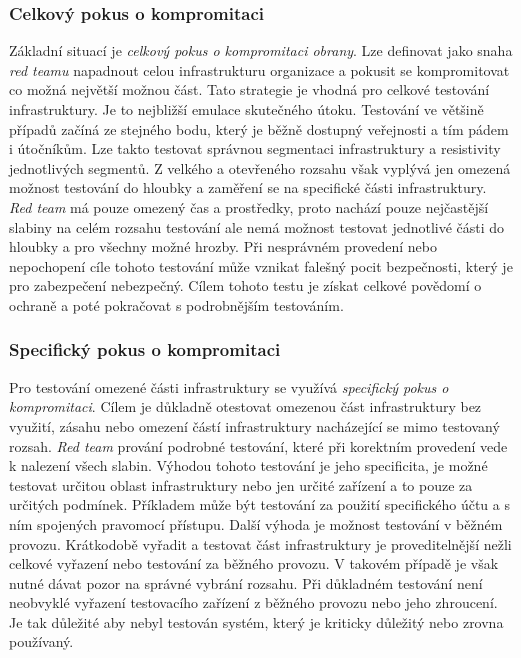 \subsubsection{Celkový pokus o kompromitaci}
Základní situací je \textit{celkový pokus o kompromitaci obrany}.
Lze definovat jako snaha \textit{red teamu} napadnout celou infrastrukturu organizace a pokusit se kompromitovat co možná největší možnou část.
Tato strategie je vhodná pro celkové testování infrastruktury.
Je to nejbližší emulace skutečného útoku.
Testování ve většině případů začíná ze stejného bodu, který je běžně dostupný veřejnosti a tím pádem i útočníkům.
Lze takto testovat správnou segmentaci infrastruktury a resistivity jednotlivých segmentů.
Z velkého a otevřeného rozsahu však vyplývá jen omezená možnost testování do hloubky a zaměření se na specifické části infrastruktury.
\textit{Red team} má pouze omezený čas a prostředky, proto nachází pouze nejčastější slabiny na celém rozsahu testování ale nemá možnost testovat jednotlivé části do hloubky a pro všechny možné hrozby.
Při nesprávném provedení nebo nepochopení cíle tohoto testování může vznikat falešný pocit bezpečnosti, který je pro zabezpečení nebezpečný.
Cílem tohoto testu je získat celkové povědomí o ochraně a poté pokračovat s podrobnějším testováním.

\subsubsection{Specifický pokus o kompromitaci}
Pro testování omezené části infrastruktury se využívá \textit{specifický pokus o kompromitaci}.
Cílem je důkladně otestovat omezenou část infrastruktury bez využití, zásahu nebo omezení částí infrastruktury nacházející se mimo testovaný rozsah.
\textit{Red team} prování podrobné testování, které při korektním provedení vede k nalezení všech slabin.
Výhodou tohoto testování je jeho specificita, je možné testovat určitou oblast infrastruktury nebo jen určité zařízení a to pouze za určitých podmínek.
Příkladem může být testování za použití specifického účtu a s ním spojených pravomocí přístupu.
Další výhoda je možnost testování v běžném provozu.
Krátkodobě vyřadit a testovat část infrastruktury je proveditelnější nežli celkové vyřazení nebo testování za běžného provozu.
V takovém případě je však nutné dávat pozor na správné vybrání rozsahu.
Při důkladném testování není neobvyklé vyřazení testovacího zařízení z běžného provozu nebo jeho zhroucení.
Je tak důležité aby nebyl testován systém, který je kriticky důležitý nebo zrovna používaný.


